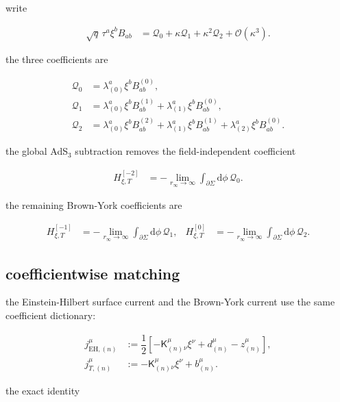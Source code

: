 write

\begin{align}
\sqrt{q}\,\tau ^a\xi ^bB_{ab} & =\mathcal{Q}_{0}+\kappa \mathcal{Q}_{1}+\kappa ^2\mathcal{Q}_{2}+\mathcal{O}(\kappa ^3).
\end{align}

the three coefficients are

\[\begin{aligned}
\mathcal{Q}_{0} & =\lambda _{(0)}^{a}\xi ^bB_{ab}^{(0)}, \\
\mathcal{Q}_{1} & =\lambda _{(0)}^{a}\xi ^bB_{ab}^{(1)}+\lambda _{(1)}^{a}\xi ^bB_{ab}^{(0)}, \\
\mathcal{Q}_{2} & =\lambda _{(0)}^{a}\xi ^bB_{ab}^{(2)}+\lambda _{(1)}^{a}\xi ^bB_{ab}^{(1)}+\lambda _{(2)}^{a}\xi ^bB_{ab}^{(0)}.
\end{aligned}\]

the global AdS$\displaystyle{_{3}}$ subtraction removes the field-independent coefficient

\begin{align}
H_{\xi,T}^{[-2]} & =-\lim _{r_{\infty}\to\infty}\int _{\partial\Sigma}\mathrm{d}\phi\,\mathcal{Q}_{0}.
\end{align}

the remaining Brown-York coefficients are

\begin{align}
H_{\xi,T}^{[-1]} & =-\lim _{r_{\infty}\to\infty}\int _{\partial\Sigma}\mathrm{d}\phi\,\mathcal{Q}_{1}, & H_{\xi,T}^{[0]}&=-\lim _{r_{\infty}\to\infty}\int _{\partial\Sigma}\mathrm{d}\phi\,\mathcal{Q}_{2}.
\end{align}

\subsection{coefficientwise matching}\label{subsec:coefficientwise-matching}

the Einstein-Hilbert surface current and the Brown-York current use the same coefficient dictionary:

\[\begin{aligned}
j_{\mathrm{EH},(n)}^{\mu} & :=\dfrac{1}{2}\left[-\mathsf{K}_{(n)}^{\mu}{}_{\nu}\xi ^{\nu}+d_{(n)}^{\mu}-z_{(n)}^{\mu}\right], \\
j_{T,(n)}^{\mu} & :=-\mathsf{K}_{(n)}^{\mu}{}_{\nu}\xi ^{\nu}+b_{(n)}^{\mu}.
\end{aligned}\]

the exact identity

